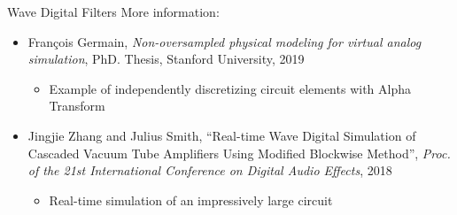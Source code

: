 \begin{frame}{Wave Digital Filters}
    More information:
    \vspace{1ex}
    \begin{itemize}
        \itemsep0.75em
        \item Fran\c{c}ois Germain, \emph{Non-oversampled physical modeling for virtual analog simulation},
        PhD. Thesis, Stanford University, 2019
        \begin{itemize}
            \item Example of independently discretizing circuit elements with Alpha Transform
        \end{itemize}

        \item Jingjie Zhang and Julius Smith, ``Real-time Wave Digital Simulation of
        Cascaded Vacuum Tube Amplifiers Using Modified Blockwise Method'',
        \emph{Proc. of the 21st International Conference on Digital Audio Effects}, 2018
        \begin{itemize}
            \item Real-time simulation of an impressively large circuit
        \end{itemize}
    \end{itemize}
\end{frame}
